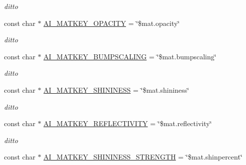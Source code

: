 \begin{DoxyCompactItemize}
\begin{DoxyCompactList}\small\item\em ditto \end{DoxyCompactList}\item 
\hypertarget{namespaceassimp_1_1material_ae93ce797e2c62350d2d976dc5ee93f10}{const char $\ast$ \hyperlink{namespaceassimp_1_1material_ae93ce797e2c62350d2d976dc5ee93f10}{A\+I\+\_\+\+M\+A\+T\+K\+E\+Y\+\_\+\+O\+P\+A\+C\+I\+T\+Y} = \char`\"{}\$mat.\+opacity\char`\"{}}\label{namespaceassimp_1_1material_ae93ce797e2c62350d2d976dc5ee93f10}

\begin{DoxyCompactList}\small\item\em ditto \end{DoxyCompactList}\item 
\hypertarget{namespaceassimp_1_1material_a49e003063ec2eb77723058f253cf0b4f}{const char $\ast$ \hyperlink{namespaceassimp_1_1material_a49e003063ec2eb77723058f253cf0b4f}{A\+I\+\_\+\+M\+A\+T\+K\+E\+Y\+\_\+\+B\+U\+M\+P\+S\+C\+A\+L\+I\+N\+G} = \char`\"{}\$mat.\+bumpscaling\char`\"{}}\label{namespaceassimp_1_1material_a49e003063ec2eb77723058f253cf0b4f}

\begin{DoxyCompactList}\small\item\em ditto \end{DoxyCompactList}\item 
\hypertarget{namespaceassimp_1_1material_a71a5d8fffbbd0ecb81e35749238fd4c8}{const char $\ast$ \hyperlink{namespaceassimp_1_1material_a71a5d8fffbbd0ecb81e35749238fd4c8}{A\+I\+\_\+\+M\+A\+T\+K\+E\+Y\+\_\+\+S\+H\+I\+N\+I\+N\+E\+S\+S} = \char`\"{}\$mat.\+shininess\char`\"{}}\label{namespaceassimp_1_1material_a71a5d8fffbbd0ecb81e35749238fd4c8}

\begin{DoxyCompactList}\small\item\em ditto \end{DoxyCompactList}\item 
\hypertarget{namespaceassimp_1_1material_a5f489a0ef5164ee867477f4e932d7ec4}{const char $\ast$ \hyperlink{namespaceassimp_1_1material_a5f489a0ef5164ee867477f4e932d7ec4}{A\+I\+\_\+\+M\+A\+T\+K\+E\+Y\+\_\+\+R\+E\+F\+L\+E\+C\+T\+I\+V\+I\+T\+Y} = \char`\"{}\$mat.\+reflectivity\char`\"{}}\label{namespaceassimp_1_1material_a5f489a0ef5164ee867477f4e932d7ec4}

\begin{DoxyCompactList}\small\item\em ditto \end{DoxyCompactList}\item 
\hypertarget{namespaceassimp_1_1material_acd690fb7e88583b404d91c00a7ef9142}{const char $\ast$ \hyperlink{namespaceassimp_1_1material_acd690fb7e88583b404d91c00a7ef9142}{A\+I\+\_\+\+M\+A\+T\+K\+E\+Y\+\_\+\+S\+H\+I\+N\+I\+N\+E\+S\+S\+\_\+\+S\+T\+R\+E\+N\+G\+T\+H} = \char`\"{}\$mat.\+shinpercent\char`\"{}}\label{namespaceassimp_1_1material_acd690fb7e88583b404d91c00a7ef9142}


\end{DoxyCompactItemize}
